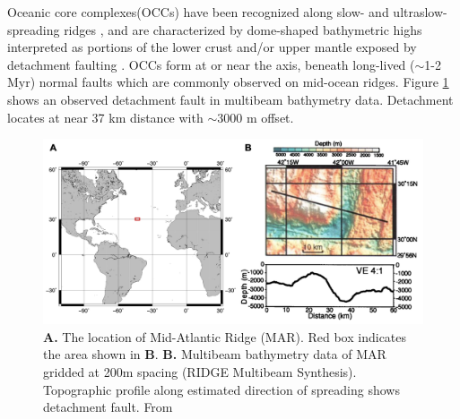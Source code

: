 \documentclass[letterpaper,12pt,notitle]{memphisthesis}                     %
\begin{document}
Oceanic core complexes(OCCs) have been recognized along slow- and ultraslow- spreading ridges \citep{Tucholke1998}, and are characterized by dome-shaped bathymetric highs interpreted as portions of the lower crust and/or upper mantle exposed by detachment faulting \citep{Tucholke1994}. OCCs form at or near the axis, beneath long-lived ($\sim$1-2 Myr) normal faults which are commonly observed on mid-ocean ridges. Figure \ref{fig:occ} shows an observed detachment fault in multibeam bathymetry data. Detachment locates at near 37 km distance with $\sim$3000 m offset.
%
\begin{figure}[!htb]
	\centering
	\includegraphics[width=0.9\linewidth,trim=4 4 4 4,clip]{./figs/occ.png}
	\caption{\textbf{A.} The location of Mid-Atlantic Ridge (MAR). Red box indicates the area shown in \textbf{B}. \textbf{B.} Multibeam bathymetry data of MAR gridded at 200m spacing (RIDGE Multibeam Synthesis). Topographic profile along estimated direction of spreading shows detachment fault. From \citet{Lavier2000}}
	\label{fig:occ}
\end{figure}
%
\end{document}
